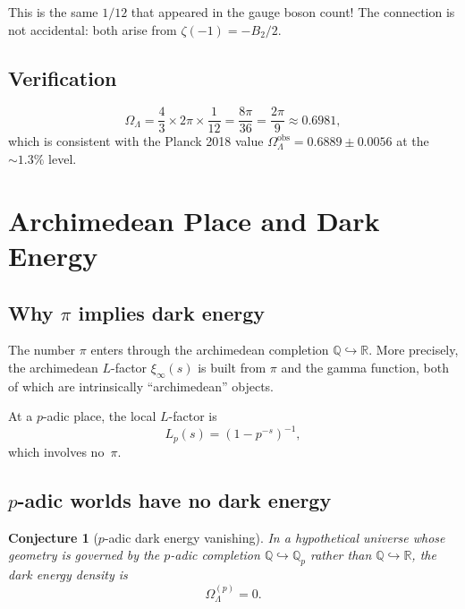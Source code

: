 \documentclass[12pt,a4paper]{article}
\newtheorem{conjecture}[theorem]{Conjecture}
\theoremstyle{definition}
\newcommand{\Q}{\mathbb{Q}}
\newcommand{\R}{\mathbb{R}}
\newcommand{\Qp}{\mathbb{Q}_p}
\newcommand{\OmL}{\Omega_\Lambda}
\begin{document}
This is the same $1/12$ that appeared in the gauge boson count!
The connection is not accidental: both arise from $\zeta(-1)=-B_2/2$.

\subsection{Verification}

\begin{equation}
  \OmL = \frac{4}{3}\times 2\pi\times\frac{1}{12}
       = \frac{8\pi}{36} = \frac{2\pi}{9}
       \approx 0.6981,
\end{equation}
which is consistent with the Planck 2018 value
$\OmL^{\text{obs}} = 0.6889 \pm 0.0056$ at the $\sim 1.3\%$ level.

\section{Archimedean Place and Dark Energy}\label{sec:archimedean}

\subsection{Why $\pi$ implies dark energy}

The number $\pi$ enters through the archimedean completion
$\Q\hookrightarrow\R$.
More precisely, the archimedean $L$-factor $\xi_\infty(s)$
is built from $\pi$ and the gamma function, both of which
are intrinsically ``archimedean'' objects.

At a $p$-adic place, the local $L$-factor is
\begin{equation}
  L_p(s) = (1-p^{-s})^{-1},
\end{equation}
which involves no~$\pi$.

\subsection{$p$-adic worlds have no dark energy}

\begin{conjecture}[$p$-adic dark energy vanishing]
In a hypothetical universe whose geometry is governed
by the $p$-adic completion $\Q\hookrightarrow\Qp$ rather
than $\Q\hookrightarrow\R$, the dark energy density is
\[
  \OmL^{(p)} = 0.
\]
\end{conjecture}
\end{document}
